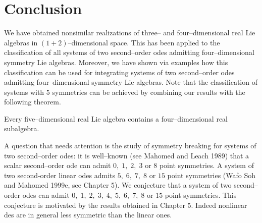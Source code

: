 \section{Conclusion}
We have obtained nonsimilar realizations of three-- and four--dimensional
real Lie algebras in $(1+2)$--dimensional space. This has been applied to
the classification of all systems of two second--order odes admitting
four--dimensional symmetry Lie algebras. Moreover, we have shown via
examples how this classification can be used for integrating systems of
two second--order odes admitting four--dimensional symmetry Lie algebras.
Note that the classification of systems with $5$ symmetries can be
achieved by combining our results with the following theorem.
\begin{theo}
\label{ch7:th2}
\begin{em}
Every five--dimensional real
Lie algebra contains a four--dimensional real subalgebra.
\end{em}
\end{theo}
A question that needs attention is the study of symmetry breaking for
systems of  two second--order odes: it is well--known (see
Mahomed and Leach 1989)
that a scalar second--order ode can admit $0,\;1,\;2,\;3$ or $8$
point symmetries.
A system of two second-order linear odes admits $5,\;6,\;7,\;8$ or $15$
point symmetries (Wafo Soh and Mahomed 1999e, see Chapter 5).
We conjecture that a system of two second--order odes can admit
$0,\;1,\;2,\;3,\;4,\;5,\;6,\;7,\;8$ or $15$ point symmetries. This conjecture
is motivated by the results obtained in Chapter 5. Indeed nonlinear des are
in general less symmetric than the linear ones.








%















